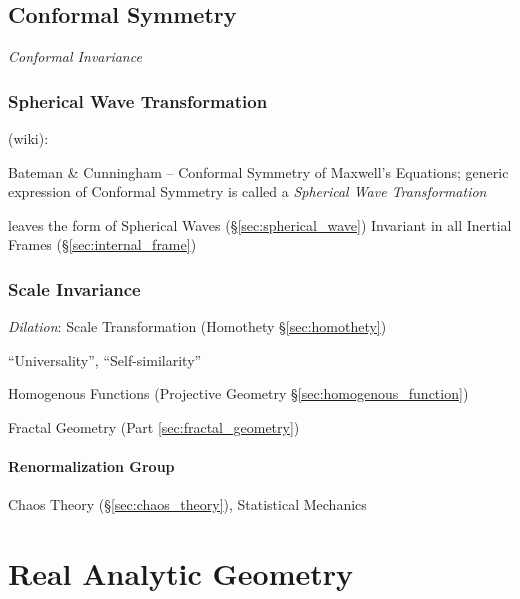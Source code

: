 \subsection{Conformal Symmetry}\label{sec:conformal_symmetry}

\emph{Conformal Invariance}



\subsubsection{Spherical Wave Transformation}
\label{sec:spherical_wave_transformation}

(wiki):

Bateman \& Cunningham -- Conformal Symmetry of Maxwell's Equations; generic
expression of Conformal Symmetry is called a \emph{Spherical Wave
  Transformation}

leaves the form of Spherical Waves (\S\ref{sec:spherical_wave}) Invariant in
all Inertial Frames (\S\ref{sec:internal_frame})



\subsubsection{Scale Invariance}\label{sec:scale_invariance}

\emph{Dilation}: Scale Transformation (Homothety \S\ref{sec:homothety})

``Universality'', ``Self-similarity''

\fist Homogenous Functions (Projective Geometry
\S\ref{sec:homogenous_function})

\fist Fractal Geometry (Part \ref{sec:fractal_geometry})



\paragraph{Renormalization Group}\label{sec:renormalization_group}\hfill

Chaos Theory (\S\ref{sec:chaos_theory}), Statistical Mechanics



\section{Real Analytic Geometry}\label{sec:real_analytic_geometry}
